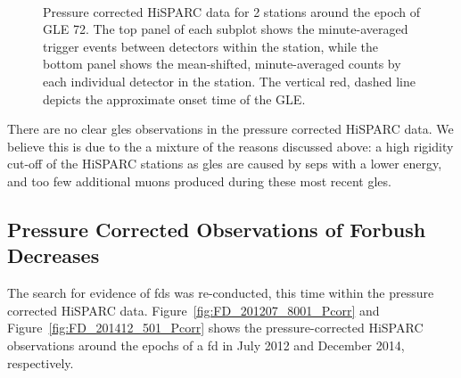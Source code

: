 \begin{figure}[ht]
	\centering
	 \\
	
	
	\caption{Pressure corrected HiSPARC data for 2 stations around the epoch of GLE 72. The top panel of each subplot shows the minute-averaged trigger events between detectors within the station, while the bottom panel shows the mean-shifted, minute-averaged counts by each individual detector in the station. The vertical red, dashed line depicts the approximate onset time of the GLE.}
	\label{fig:GLE_72_Pcorr}
\end{figure}

There are no clear \glspl{gle} observations in the pressure corrected HiSPARC data. We believe this is due to the a mixture of the reasons discussed above: a high rigidity cut-off of the HiSPARC stations as \glspl{gle} are caused by \glspl{sep} with a lower energy, and too few additional muons produced during these most recent \glspl{gle}.


\subsection{Pressure Corrected Observations of Forbush Decreases}

The search for evidence of \glspl{fd} was re-conducted, this time within the pressure corrected HiSPARC data. Figure~\ref{fig:FD_201207_8001_Pcorr} and Figure~\ref{fig:FD_201412_501_Pcorr} shows the pressure-corrected HiSPARC observations around the epochs of a \gls{fd} in July 2012 and December 2014, respectively.

